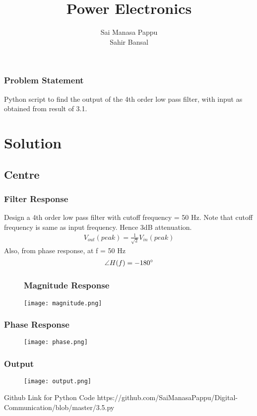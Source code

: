 \documentclass{beamer}
\title{Power Electronics}
\author{Sai Manasa Pappu \\ Sahir Bansal }
\date{}
\theoremstyle{remark}
\let\vec\mathbf
\numberwithin{equation}{section}
\begin{document}
\begin{frame}
\titlepage
\end{frame}


\begin{frame}
\frametitle{Problem Statement}
Python script to find the output of the 4th order low pass filter, with input as obtained from result of 3.1. 
\bigbreak

\end{frame}

\section{Solution}
\subsection{Centre}
\begin{frame}
\frametitle{Filter Response}
\bigbreak
\bigbreak
\bigbreak
Design a 4th order low pass filter with cutoff frequency = 50 Hz. Note that cutoff frequency is same as input frequency. Hence 3dB attenuation. 
\begin{align}
V_{out} (peak) = \frac{1}{\sqrt{2}}V_{in} (peak) 
\end{align}
%
Also, from phase response, at f = 50 Hz
\begin{align}
\angle H(f) = -180 \degree 
\end{align}
\end{frame}


\begin{frame}
\begin{figure}
\frametitle{Magnitude Response}
\texttt{[image: magnitude.png]}
\label{magnitude.png}
\end{figure}
\end{frame}

\begin{frame}
\frametitle{Phase Response}
\begin{figure}
\centering
\texttt{[image: phase.png]}
\end{figure}
\end{frame}




\begin{frame}
\frametitle{Output}
\begin{figure}
\centering
\texttt{[image: output.png]}
\end{figure}
\end{frame}


\begin{frame}{Github Link for Python Code }
    https://github.com/SaiManasaPappu/Digital-Communication/blob/master/3.5.py
\end{frame}
\end{document}
